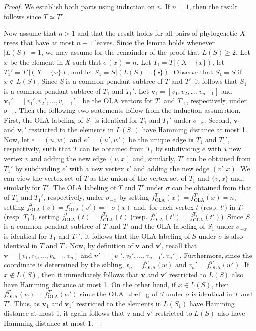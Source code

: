\documentclass{article}
\newcommand{\OLA}{\mathrm{OLA}}
\begin{document}
\begin{proof}
We establish both parts using induction on $n$. If $n=1$, then the result follows since $T\simeq T'$. 

Now assume that $n>1$ and that the result holds for all pairs of phylogenetic $X$-trees that have at most $n-1$ leaves. Since the lemma holds whenever $|L(S)|=1$, we may assume for the remainder of the proof that $L(S)\geq 2$. Let $x$ be the element in $X$ such that $\sigma(x)=n$. Let $T_1=T|(X-\{x\})$, let $T_1'=T'|(X-\{x\})$, and let $S_1=S|(L(S)- \{x\})$. Observe that $S_1=S$ if $x\notin L(S)$. Since $S$ is a common pendant subtree of $T$ and $T'$, it follows that $S_1$ is a common pendant subtree of $T_1$ and $T_1'$.  Let $\mathbf{v}_1=[v_1,v_2,\ldots,v_{n-1}]$ and $\mathbf{v}_1'=[v_1',v_2',\ldots,v_{n-1}']$  be the $\OLA$ vectors for  $T_1$ and $T'_1$, respectively, under $\sigma_{-x}$.  Then the following two statements  follow from the induction assumption. First, the $\OLA$ labeling of $S_1$ is identical for $T_1$ and $T_1'$ under $\sigma_{-x}$. Second, $\mathbf{v}_1$ and $\mathbf{v}_1'$ restricted to the elements in $L(S_1)$ have Hamming distance at most 1. Now, let $e=(u,w)$ and $e'=(u',w')$ be the unique edge in $T_1$ and $T_1'$, respectively, such that $T$ can be obtained from $T_1$ by subdividing $e$ with a new vertex $v$ and adding the new edge $(v,x)$ and, similarly, $T'$ can be obtained from $T_1'$ by subdividing $e'$ with a new vertex $v'$ and adding the new edge $(v',x)$. We can view the vertex set of $T$ as the union of the vertex set of $T_1$ and $\{v,x\}$ and, similarly for $T'$.  The OLA labeling of $T$ and $T'$ under $\sigma$ can be obtained from that of $T_1$ and $T_1'$, respectively, under $\sigma_{-x}$ by setting $f^T_\OLA(x)=f^{T'}_\OLA(x)=n$, setting $f^T_\OLA(v)=f^{T'}_\OLA(v')=-\sigma(x)$ and, for each vertex $t$ (resp. $t'$) in $T_1$ (resp. $T_1'$), setting $f^T_\OLA(t) = f^{T_1}_\OLA(t)$ (resp. $f^T_\OLA(t') = f^{T_1}_\OLA(t')$). Since $S$ is a common pendant subtree of $T$ and $T'$ and the $\OLA$ labeling of $S_1$ under $\sigma_{-x}$ is identical for $T_1$ and $T_1'$, it  follows that the OLA labeling of $S$ under $\sigma$ is also identical in $T$ and $T'$. Now, by definition of $\mathbf{v}$  and $\mathbf{v}'$, recall that  $\mathbf{v}=[v_1,v_2,\ldots,v_{n-1},v_n]$ and $\mathbf{v}'=[v_1',v_2',\ldots,v_{n-1}', v_n']$. Furthermore, since the coordinate is determined by the sibling, $v_n=f^T_\OLA(w)$ and $v_n'=f^{T'}_\OLA(w')$. 
If $x\notin L(S)$, then it immediately follows that $\mathbf{v}$ and $\mathbf{v}'$ restricted to $L(S)$ also have Hamming distance at most 1. On the other hand, if $x\in L(S)$, then  $f^T_\OLA(w)=f^{T'}_\OLA(w')$ since the OLA labeling of $S$ under $\sigma$ is identical in $T$ and $T'$. Thus, as $\mathbf{v}_1$ and $\mathbf{v}_1'$ restricted to the elements in $L(S_1)$ have Hamming distance at most 1, it again follows that $\mathbf{v}$ and $\mathbf{v}'$ restricted to $L(S)$ also have Hamming distance at most 1. 
\end{proof}
\end{document}
